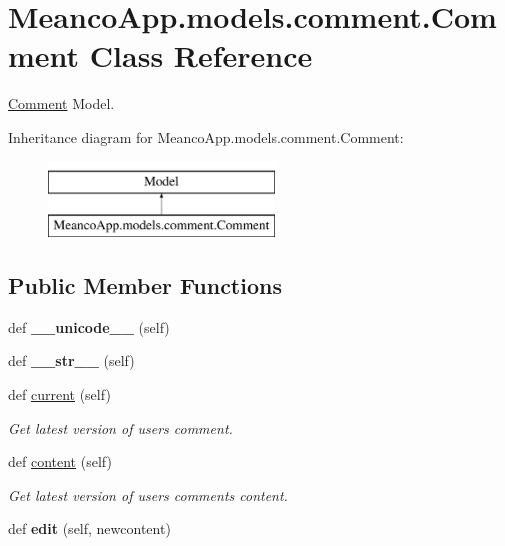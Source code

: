 \hypertarget{class_meanco_app_1_1models_1_1comment_1_1_comment}{}\section{Meanco\+App.\+models.\+comment.\+Comment Class Reference}
\label{class_meanco_app_1_1models_1_1comment_1_1_comment}


\hyperlink{class_meanco_app_1_1models_1_1comment_1_1_comment}{Comment} Model.  


Inheritance diagram for Meanco\+App.\+models.\+comment.\+Comment\+:\begin{figure}[H]
\begin{center}
\leavevmode
\includegraphics[height=2.000000cm]{class_meanco_app_1_1models_1_1comment_1_1_comment}
\end{center}
\end{figure}
\subsection*{Public Member Functions}
\begin{DoxyCompactItemize}
\item 
\hypertarget{class_meanco_app_1_1models_1_1comment_1_1_comment_a9afc9f35fc4bff3144619e2ef3187a84}{}\label{class_meanco_app_1_1models_1_1comment_1_1_comment_a9afc9f35fc4bff3144619e2ef3187a84} 
def {\bfseries \+\_\+\+\_\+unicode\+\_\+\+\_\+} (self)
\item 
\hypertarget{class_meanco_app_1_1models_1_1comment_1_1_comment_a8312514f1c230d74f35f8183e2da02a2}{}\label{class_meanco_app_1_1models_1_1comment_1_1_comment_a8312514f1c230d74f35f8183e2da02a2} 
def {\bfseries \+\_\+\+\_\+str\+\_\+\+\_\+} (self)
\item 
\hypertarget{class_meanco_app_1_1models_1_1comment_1_1_comment_a6280b20af5afa2eb3f561f6cd6aa1058}{}\label{class_meanco_app_1_1models_1_1comment_1_1_comment_a6280b20af5afa2eb3f561f6cd6aa1058} 
def \hyperlink{class_meanco_app_1_1models_1_1comment_1_1_comment_a6280b20af5afa2eb3f561f6cd6aa1058}{current} (self)
\begin{DoxyCompactList}\small\item\em Get latest version of users comment. \end{DoxyCompactList}\item 
def \hyperlink{class_meanco_app_1_1models_1_1comment_1_1_comment_a9c6987c2a0309d97cb57aca01a84e689}{content} (self)
\begin{DoxyCompactList}\small\item\em Get latest version of users comments content. \end{DoxyCompactList}\item 
\hypertarget{class_meanco_app_1_1models_1_1comment_1_1_comment_ad812d2464ca73488008aa63ed810117d}{}\label{class_meanco_app_1_1models_1_1comment_1_1_comment_ad812d2464ca73488008aa63ed810117d} 
def {\bfseries edit} (self, newcontent)
\end{DoxyCompactItemize}
